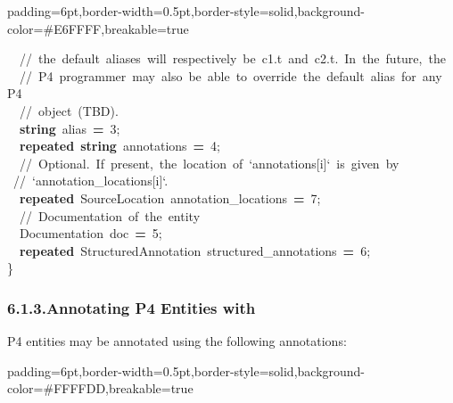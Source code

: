 \documentclass[11pt]{article}
\begin{document}
{\begin{mdbmargintb}{6pt}{6pt}
\begin{mdblock}{padding=6pt,border-width=0.5pt,border-style=solid,background-color=\#E6FFFF,breakable=true}
\begin{mdpre}
{{~~{//~the~default~aliases~will~respectively~be~c1.t~and~c2.t.~In~the~future,~the}\\
~~{//~P4~programmer~may~also~be~able~to~override~the~default~alias~for~any~P4}\\
~~{//~object~(TBD).}\\
~~{\bfseries{string}}~alias~{\bfseries{=}}~{3};\\
~~{\bfseries{repeated}}~{\bfseries{string}}~annotations~{\bfseries{=}}~{4};\\
~~{//~Optional.~If~present,~the~location~of~`annotations{}[i]`~is~given~by}\\
~{//~`annotation\_locations{}[i]`.}\\
~~{\bfseries{repeated}}~SourceLocation~annotation\_locations~{\bfseries{=}}~{7};\\
~~{//~Documentation~of~the~entity}\\
~~Documentation~doc~{\bfseries{=}}~{5};\\
~~{\bfseries{repeated}}~StructuredAnnotation~structured\_annotations~{\bfseries{=}}~{6};\\
\}}}%
\end{mdpre}%
\end{mdblock}%
\end{mdbmargintb}%

\subsubsection{6.1.3.\hspace*{0.5em}Annotating P4 Entities with }\label{sec-annotating-p4-entities-with-documentation}%

\noindent{}P4 entities may be annotated using the following annotations:%

\begin{mdbmargintb}{6pt}{6pt}%
\begin{mdblock}{padding=6pt,border-width=0.5pt,border-style=solid,background-color=\#FFFFDD,breakable=true}%
\begin{mdpre}%
\end{mdpre}%
\end{mdblock}%
\end{mdbmargintb}%

}
\end{document}

